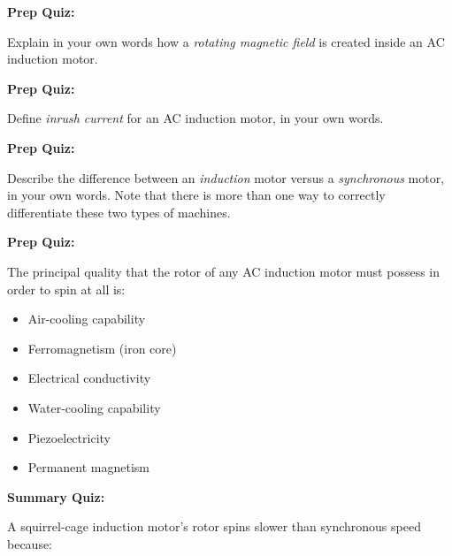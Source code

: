 \vfil \eject

\noindent
{\bf Prep Quiz:}

Explain in your own words how a {\it rotating magnetic field} is created inside an AC induction motor.











\vfil \eject

\noindent
{\bf Prep Quiz:}

Define {\it inrush current} for an AC induction motor, in your own words.










\vfil \eject

\noindent
{\bf Prep Quiz:}

Describe the difference between an {\it induction} motor versus a {\it synchronous} motor, in your own words.  Note that there is more than one way to correctly differentiate these two types of machines.









\vfil \eject

\noindent
{\bf Prep Quiz:}

The principal quality that the rotor of any AC induction motor must possess in order to spin at all is:

\begin{itemize}
\item{} Air-cooling capability
\vskip 5pt 
\item{} Ferromagnetism (iron core)
\vskip 5pt 
\item{} Electrical conductivity
\vskip 5pt 
\item{} Water-cooling capability
\vskip 5pt 
\item{} Piezoelectricity
\vskip 5pt 
\item{} Permanent magnetism
\end{itemize}






\vfil \eject

\noindent
{\bf Summary Quiz:}

A squirrel-cage induction motor's rotor spins slower than synchronous speed because:

